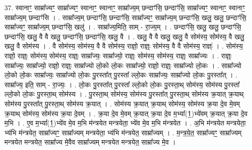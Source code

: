 \documentclass[17pt]{extarticle}
\begin{document}
37. स्वानाꣳ॒॒ साम्रा᳚ज्यꣳ॒॒ साम्रा᳚ज्यꣳ॒॒ स्वानाꣳ॒॒ स्वानाꣳ॒॒ साम्रा᳚ज्य॒म् छन्दाꣳ॑सि॒ छन्दाꣳ॑सि॒ साम्रा᳚ज्यꣳ॒॒ स्वानाꣳ॒॒ स्वानाꣳ॒॒ साम्रा᳚ज्य॒म् छन्दाꣳ॑सि । . साम्रा᳚ज्य॒म् छन्दाꣳ॑सि॒ छन्दाꣳ॑सि॒ साम्रा᳚ज्यꣳ॒॒ साम्रा᳚ज्य॒म् छन्दाꣳ॑सि॒ खलु॒ खलु॒ छन्दाꣳ॑सि॒ साम्रा᳚ज्यꣳ॒॒ साम्रा᳚ज्य॒म् छन्दाꣳ॑सि॒ खलु॑ । . साम्रा᳚ज्य॒मिति॒ साम् - रा॒ज्य॒म् । . छन्दाꣳ॑सि॒ खलु॒ खलु॒ छन्दाꣳ॑सि॒ छन्दाꣳ॑सि॒ खलु॒ वै वै खलु॒ छन्दाꣳ॑सि॒ छन्दाꣳ॑सि॒ खलु॒ वै । . खलु॒ वै वै खलु॒ खलु॒ वै सोम॑स्य॒ सोम॑स्य॒ वै खलु॒ खलु॒ वै सोम॑स्य । . वै सोम॑स्य॒ सोम॑स्य॒ वै वै सोम॑स्य॒ राज्ञो॒ राज्ञ्ः॒ सोम॑स्य॒ वै वै सोम॑स्य॒ राज्ञ्ः॑ । . सोम॑स्य॒ राज्ञो॒ राज्ञ्ः॒ सोम॑स्य॒ सोम॑स्य॒ राज्ञ्ः॒ साम्रा᳚ज्यः॒ साम्रा᳚ज्यो॒ राज्ञ्ः॒ सोम॑स्य॒ सोम॑स्य॒ राज्ञ्ः॒ साम्रा᳚ज्यः । . राज्ञ्ः॒ साम्रा᳚ज्यः॒ साम्रा᳚ज्यो॒ राज्ञो॒ राज्ञ्ः॒ साम्रा᳚ज्यो लो॒को लो॒कः साम्रा᳚ज्यो॒ राज्ञो॒ राज्ञ्ः॒ साम्रा᳚ज्यो लो॒कः । . साम्रा᳚ज्यो लो॒को लो॒कः साम्रा᳚ज्यः॒ साम्रा᳚ज्यो लो॒कः पु॒रस्ता᳚त् पु॒रस्ता᳚ ल्लो॒कः साम्रा᳚ज्यः॒ साम्रा᳚ज्यो लो॒कः पु॒रस्ता᳚त् । . साम्रा᳚ज्य॒ इति॒ साम् - रा॒ज्यः॒ । . लो॒कः पु॒रस्ता᳚त् पु॒रस्ता᳚ ल्लो॒को लो॒कः पु॒रस्ता॒थ् सोम॑स्य॒ सोम॑स्य पु॒रस्ता᳚ ल्लो॒को लो॒कः पु॒रस्ता॒थ् सोम॑स्य । . पु॒रस्ता॒थ् सोम॑स्य॒ सोम॑स्य पु॒रस्ता᳚त् पु॒रस्ता॒थ् सोम॑स्य क्र॒यात् क्र॒याथ् सोम॑स्य पु॒रस्ता᳚त् पु॒रस्ता॒थ् सोम॑स्य क्र॒यात् । . सोम॑स्य क्र॒यात् क्र॒याथ् सोम॑स्य॒ सोम॑स्य क्र॒या दे॒व मे॒वम् क्र॒याथ् सोम॑स्य॒ सोम॑स्य क्र॒या दे॒वम् । . क्र॒या दे॒व मे॒वम् क्र॒यात् क्र॒या दे॒व म॒भ्या᳚(1॒)भ्ये॑वम् क्र॒यात् क्र॒या दे॒व म॒भि । . ए॒व म॒भ्या᳚(1॒)भ्ये॑व मे॒व म॒भि म॑न्त्रयेत मन्त्रयेता॒ भ्ये॑व मे॒व म॒भि म॑न्त्रयेत । . अ॒भि म॑न्त्रयेत मन्त्रयेता॒ भ्य॑भि म॑न्त्रयेत॒ साम्रा᳚ज्यꣳ॒॒ साम्रा᳚ज्यम् मन्त्रयेता॒ भ्य॑भि म॑न्त्रयेत॒ साम्रा᳚ज्यम् । . म॒न्त्र॒ये॒त॒ साम्रा᳚ज्यꣳ॒॒ साम्रा᳚ज्यम् मन्त्रयेत मन्त्रयेत॒ साम्रा᳚ज्य मे॒वैव साम्रा᳚ज्यम् मन्त्रयेत मन्त्रयेत॒ साम्रा᳚ज्य मे॒व । \newline
\end{document}
